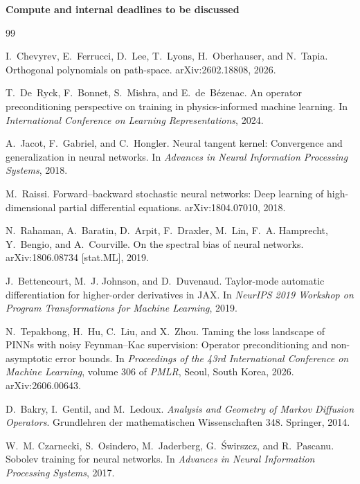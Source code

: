 \documentclass[english]{article}
\begin{document}
\textbf{Compute and internal deadlines to be discussed}

\newpage
\begin{thebibliography}{99}

I.~Chevyrev, E.~Ferrucci, D.~Lee, T.~Lyons, H.~Oberhauser, and N.~Tapia.
\newblock Orthogonal polynomials on path-space.
\newblock arXiv:2602.18808, 2026.

T.~De~Ryck, F.~Bonnet, S.~Mishra, and E.~de~B\'ezenac.
\newblock An operator preconditioning perspective on training in physics-informed machine learning.
\newblock In \emph{International Conference on Learning Representations}, 2024.

A.~Jacot, F.~Gabriel, and C.~Hongler.
\newblock Neural tangent kernel: Convergence and generalization in neural networks.
\newblock In \emph{Advances in Neural Information Processing Systems}, 2018.

M.~Raissi.
\newblock Forward--backward stochastic neural networks: Deep learning of
  high-dimensional partial differential equations.
\newblock arXiv:1804.07010, 2018.

N.~Rahaman, A.~Baratin, D.~Arpit, F.~Draxler, M.~Lin, F.~A. Hamprecht,
Y.~Bengio, and A.~Courville.
\newblock On the spectral bias of neural networks.
\newblock arXiv:1806.08734 [stat.ML], 2019.

J.~Bettencourt, M.~J. Johnson, and D.~Duvenaud.
\newblock Taylor-mode automatic differentiation for higher-order derivatives in {JAX}.
\newblock In \emph{NeurIPS 2019 Workshop on Program Transformations for Machine Learning}, 2019.

N.~Tepakbong, H.~Hu, C.~Liu, and X.~Zhou.
\newblock Taming the loss landscape of {PINN}s with noisy {F}eynman--{K}ac
  supervision: Operator preconditioning and non-asymptotic error bounds.
\newblock In \emph{Proceedings of the 43rd International Conference on Machine
  Learning}, volume 306 of \emph{PMLR}, Seoul, South Korea, 2026.
\newblock arXiv:2606.00643.

D.~Bakry, I.~Gentil, and M.~Ledoux.
\newblock \emph{Analysis and Geometry of {M}arkov Diffusion Operators}.
\newblock Grundlehren der mathematischen Wissenschaften 348. Springer, 2014.

W.~M. Czarnecki, S.~Osindero, M.~Jaderberg, G.~\'Swirszcz, and R.~Pascanu.
\newblock Sobolev training for neural networks.
\newblock In \emph{Advances in Neural Information Processing Systems}, 2017.


\end{thebibliography}
\end{document}
